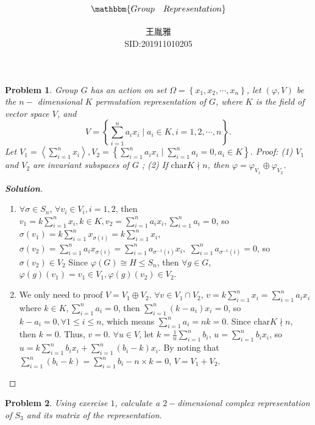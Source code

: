 \documentclass{ctexart}
\title{$\mathbbm{Group\quad Representation}$}
\author{王胤雅\\
SID:201911010205\\
\email{201911010205@mail.bnu.edu.cn}}
\newtheorem{problem}{\textbf{Problem}}
\newenvironment{solution}{\begin{proof}[\textbf{Solution}]}{\end{proof}}
\renewcommand\phi{\varphi}
\renewcommand{\(}{\left(}
\renewcommand{\)}{\right)}
\renewcommand{\phi}{\varphi}
\newcommand{\chara}{\mathrm{char}}
\begin{document}
\large
\maketitle
\begin{problem}
    Group $G$ has an action on set $\Omega=\left\{x_1, x_2, \cdots, x_n\right\}$, let $(\phi, V)$ be the $n-$ dimensional $K$ permutation representation of $G$, where $K$ is the field of vector space $V$, and 
    $$
V=\left\{\sum_{i=1}^n a_i x_i \mid a_i \in K, i=1,2, \cdots, n\right\} .
$$
Let
$
 V_1=\left\langle\sum_{i=1}^n x_i\right\rangle, 
 V_2=\left\{\sum_{i=1}^n a_i x_i \mid \sum_{i=1}^n a_i=0, a_i \in K\right\} .
$
Proof: (1) $V_1$ and $V_2$ are  invariant subspaces of $G$ ;
(2) If $\chara K \nmid n$, then $\varphi=\varphi_{V_1} \oplus \varphi_{V_2}$.
\end{problem}
\begin{solution}
\begin{enumerate}
    \item $\forall \sigma\in S_n$, $\forall v_i\in V_i,i=1,2$, 
    then $v_1=k\sum_{i=1}^n x_i,k\in K,v_2=\sum_{i=1}^n a_i x_i, \sum_{i=1}^n a_i=0$, 
    so $\sigma(v_1)=k\sum_{i=1}^n x_{\sigma(i)}=k\sum_{i=1}^n x_i$, 
    $\sigma(v_2)=\sum_{i=1}^n a_i x_{\sigma(i)}=\sum_{i=1}^n a_{\sigma^{-1}(i)} x_i,$ $\sum_{i=1}^n a_{\sigma^{-1}(i)}=0$, so $\sigma(v_2)\in V_2$
    Since $\phi(G)\cong H\leq S_n$, then $\forall g\in G$, $\phi(g)(v_1)=v_1\in V_1,\phi(g)(v_2)\in V_2$.
    \item We only need to proof $V=V_1\oplus V_2$.
    $\forall v\in V_1\cap V_2$, $v=k\sum_{i=1}^n x_i=\sum_{i=1}^n a_i x_i$ where $k\in K ,\sum_{i=1}^n a_i=0$, then $\sum_{i=1}^n(k-a_i)x_i=0$, so $k-a_i=0,\forall 1\leq i\leq n$, which means $\sum_{i=1}^n a_i=nk=0$. 
    Since $\chara K\nmid n$, then $k=0$. Thus, $v=0$. $\forall u\in V$, let $k=\frac{1}{n}\sum_{i=1}^nb_i$, $u=\sum_{i=1}^n b_ix_i$, so $u=k\sum_{i=1}^nb_ix_i+\sum_{i=1}^n(b_i-k)x_i$. By noting that $\sum_{i=1}^n(b_i-k)=\sum_{i=1}^nb_i-n\times k=0$, $V=V_1+V_2$.
\end{enumerate}


\end{solution}
\begin{problem}
 Using exercise $1$, calculate a $2-$dimensional complex representation of $S_3$ and its matrix of the representation.
\end{problem}
\end{document}
